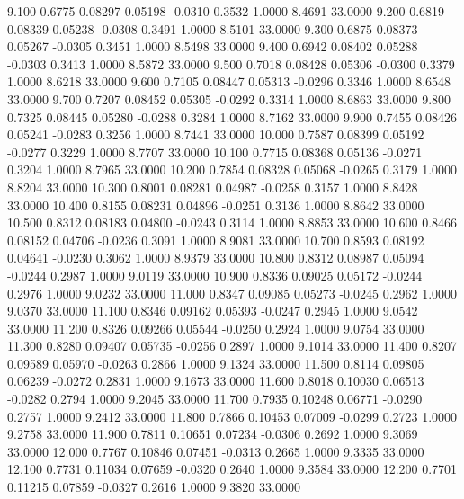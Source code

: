    9.100   0.6775   0.08297   0.05198  -0.0310   0.3532   1.0000   8.4691  33.0000
   9.200   0.6819   0.08339   0.05238  -0.0308   0.3491   1.0000   8.5101  33.0000
   9.300   0.6875   0.08373   0.05267  -0.0305   0.3451   1.0000   8.5498  33.0000
   9.400   0.6942   0.08402   0.05288  -0.0303   0.3413   1.0000   8.5872  33.0000
   9.500   0.7018   0.08428   0.05306  -0.0300   0.3379   1.0000   8.6218  33.0000
   9.600   0.7105   0.08447   0.05313  -0.0296   0.3346   1.0000   8.6548  33.0000
   9.700   0.7207   0.08452   0.05305  -0.0292   0.3314   1.0000   8.6863  33.0000
   9.800   0.7325   0.08445   0.05280  -0.0288   0.3284   1.0000   8.7162  33.0000
   9.900   0.7455   0.08426   0.05241  -0.0283   0.3256   1.0000   8.7441  33.0000
  10.000   0.7587   0.08399   0.05192  -0.0277   0.3229   1.0000   8.7707  33.0000
  10.100   0.7715   0.08368   0.05136  -0.0271   0.3204   1.0000   8.7965  33.0000
  10.200   0.7854   0.08328   0.05068  -0.0265   0.3179   1.0000   8.8204  33.0000
  10.300   0.8001   0.08281   0.04987  -0.0258   0.3157   1.0000   8.8428  33.0000
  10.400   0.8155   0.08231   0.04896  -0.0251   0.3136   1.0000   8.8642  33.0000
  10.500   0.8312   0.08183   0.04800  -0.0243   0.3114   1.0000   8.8853  33.0000
  10.600   0.8466   0.08152   0.04706  -0.0236   0.3091   1.0000   8.9081  33.0000
  10.700   0.8593   0.08192   0.04641  -0.0230   0.3062   1.0000   8.9379  33.0000
  10.800   0.8312   0.08987   0.05094  -0.0244   0.2987   1.0000   9.0119  33.0000
  10.900   0.8336   0.09025   0.05172  -0.0244   0.2976   1.0000   9.0232  33.0000
  11.000   0.8347   0.09085   0.05273  -0.0245   0.2962   1.0000   9.0370  33.0000
  11.100   0.8346   0.09162   0.05393  -0.0247   0.2945   1.0000   9.0542  33.0000
  11.200   0.8326   0.09266   0.05544  -0.0250   0.2924   1.0000   9.0754  33.0000
  11.300   0.8280   0.09407   0.05735  -0.0256   0.2897   1.0000   9.1014  33.0000
  11.400   0.8207   0.09589   0.05970  -0.0263   0.2866   1.0000   9.1324  33.0000
  11.500   0.8114   0.09805   0.06239  -0.0272   0.2831   1.0000   9.1673  33.0000
  11.600   0.8018   0.10030   0.06513  -0.0282   0.2794   1.0000   9.2045  33.0000
  11.700   0.7935   0.10248   0.06771  -0.0290   0.2757   1.0000   9.2412  33.0000
  11.800   0.7866   0.10453   0.07009  -0.0299   0.2723   1.0000   9.2758  33.0000
  11.900   0.7811   0.10651   0.07234  -0.0306   0.2692   1.0000   9.3069  33.0000
  12.000   0.7767   0.10846   0.07451  -0.0313   0.2665   1.0000   9.3335  33.0000
  12.100   0.7731   0.11034   0.07659  -0.0320   0.2640   1.0000   9.3584  33.0000
  12.200   0.7701   0.11215   0.07859  -0.0327   0.2616   1.0000   9.3820  33.0000
